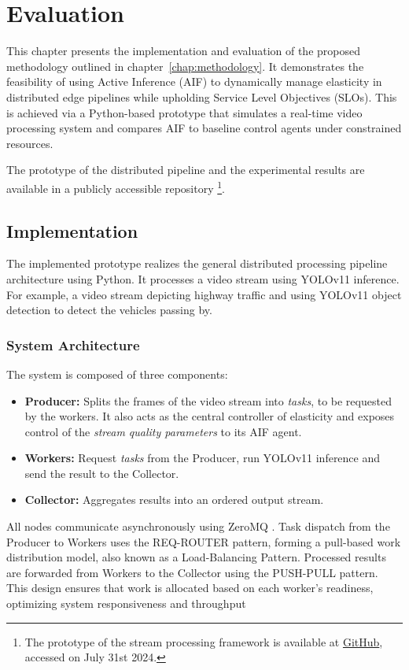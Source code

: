 \chapter{Evaluation}
This chapter presents the implementation and evaluation of the proposed methodology outlined
in chapter~\ref{chap:methodology}. It demonstrates the feasibility of using Active Inference (AIF) to dynamically manage elasticity in distributed edge pipelines while upholding Service Level Objectives (SLOs). This is achieved via a Python-based prototype that simulates a real-time video processing system and compares AIF to baseline control agents under constrained resources.

The prototype of the distributed pipeline and the experimental results are available in a publicly accessible repository \footnote{The prototype of the stream processing framework is available at \href{https://github.com/JohnnyElaine/bsc_aif_parallel_pipeline}{GitHub}, accessed on July 31st 2024.}.

\section{Implementation}
\label{sec:implementation}
The implemented prototype realizes the general distributed processing pipeline architecture using Python. It processes a video stream using YOLOv11 inference. For example, a video stream depicting highway traffic and using YOLOv11 object detection to detect the vehicles passing by.

\subsection{System Architecture}
The system is composed of three components:
\begin{itemize}
    \item \textbf{Producer:} Splits the frames of the video stream into \textit{tasks}, to be requested by the workers. It also acts as the central controller of elasticity and exposes control of the \textit{stream quality parameters} to its AIF agent.
    \item \textbf{Workers:} Request \textit{tasks} from the Producer, run YOLOv11 inference and send the result to the Collector.
    \item \textbf{Collector:} Aggregates results into an ordered output stream.
\end{itemize}

All nodes communicate asynchronously using ZeroMQ \cite{noauthor_zeromqpyzmq_nodate}. Task dispatch from the Producer to Workers uses the REQ-ROUTER pattern, forming a pull-based work distribution model, also known as a Load-Balancing Pattern. Processed results are forwarded from Workers to the Collector using the PUSH-PULL pattern. This design ensures that work is allocated based on each worker’s readiness, optimizing system responsiveness and throughput

